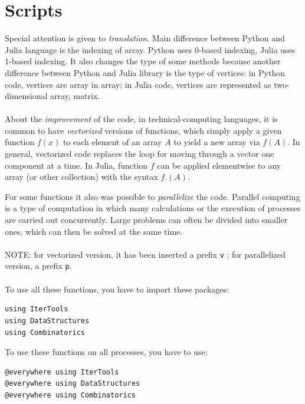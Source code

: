 \documentclass{article}
\begin{document}
\section{Scripts}
Special attention is given to \emph{translation}. Main difference between Python and Julia language is the indexing of array. Python uses 0-based indexing, Julia uses 1-based indexing. It also changes the type of some methods because another difference between Python and Julia library is the type of vertices: in Python code, vertices are array in array; in Julia code, vertices are represented as two-dimensional array, matrix.
\\ \\
About the \emph{improvement} of the code, in technical-computing languages, it is common to have  \emph{vectorized} versions of functions, which simply apply a given function $f(x)$ to each element of an array $A$ to yield a new array via $f(A)$. In general, vectorized code replaces the loop for moving through a vector one component at a time. In Julia, function $f$ can be applied elementwise to any array (or other collection) with the syntax $f.(A)$.

For some functions it also was possible to \emph{parallelize} the code.
Parallel computing is a type of computation in which many calculations or the execution of processes are carried out concurrently. Large problems can often be divided into smaller ones, which can then be solved at the same time.
\\ \\
NOTE: for vectorized version, it has been inserted a prefix \texttt{v} ; for parallelized version, a prefix \texttt{p}.
\\ \\
To use all these functions, you have to import these packages:
\begin{flushleft}\small
\begin{list}{}{} \item
\begin{Verbatim}
using IterTools
using DataStructures
using Combinatorics
\end{Verbatim}
\end{list}
\end{flushleft}
\vspace{1ex}
To use these functions on all processes, you have to use:
\begin{flushleft}\small
\begin{list}{}{} \item
\begin{Verbatim}
@everywhere using IterTools
@everywhere using DataStructures
@everywhere using Combinatorics
\end{Verbatim}
\end{list}
\end{flushleft}
\end{document}
